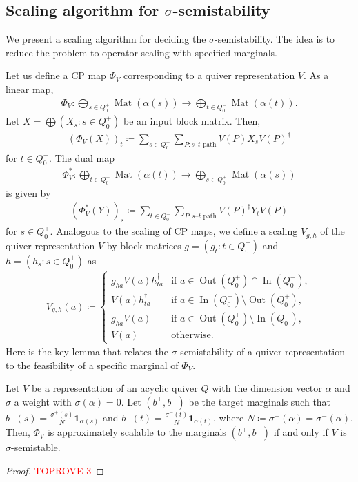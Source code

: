 \documentclass[a4paper,11pt]{article}
\numberwithin{equation}{section}
\newcommand{\ones}{\mathbf{1}}
\DeclareMathOperator{\Mat}{Mat}
\DeclareMathOperator{\In}{In}
\DeclareMathOperator{\Out}{Out}
\begin{document}
\subsection{Scaling algorithm for $\sigma$-semistability}
We present a scaling algorithm for deciding the $\sigma$-semistability.
The idea is to reduce the problem to operator scaling with specified marginals. 

Let us define a CP map $\Phi_V$ corresponding to a quiver representation $V$.
As a linear map,
\begin{align}
    \Phi_V : \bigoplus_{s \in Q_0^+} \Mat(\alpha(s)) \to \bigoplus_{t \in Q_0^-} \Mat(\alpha(t)).
\end{align}
Let $X = \bigoplus (X_s : s \in Q_0^+)$ be an input block matrix.
Then,
\begin{align}
    (\Phi_V(X))_t \coloneqq  \sum_{s \in Q_0^+}\sum_{P: \text{$s$--$t$ path}} V(P) X_{s} V(P)^\dagger
\end{align}
for $t \in Q_0^-$.
The dual map 
\begin{align}
    \Phi_V^*: \bigoplus_{t \in Q_0^-} \Mat(\alpha(t)) \to \bigoplus_{s \in Q_0^+} \Mat(\alpha(s))
\end{align}
is given by
\begin{align}
    (\Phi_V^*(Y))_s \coloneqq  \sum_{t \in Q_0^-}\sum_{P: \text{$s$--$t$ path}} V(P)^\dagger Y_{t} V(P)
\end{align}
for $s \in Q_0^+$.
Analogous to the scaling of CP maps, we define a scaling $V_{g,h}$ of the quiver representation $V$ by block matrices $g = (g_t : t \in Q_0^-)$ and $h = (h_s : s \in Q_0^+)$ as
\begin{align}
    V_{g,h}(a) \coloneqq 
    \begin{cases}
        g_{ha} V(a) h_{ta}^{\dagger}  & \text{if $a \in \Out(Q_0^+) \cap \In(Q_0^-)$}, \\
        V(a) h_{ta}^{\dagger} & \text{if $a \in \In(Q_0^-) \setminus \Out(Q_0^+)$}, \\
        g_{ha} V(a)  & \text{if $a \in \Out(Q_0^+) \setminus \In(Q_0^-)$}, \\
        V(a) & \text{otherwise}.
    \end{cases}
\end{align}
Here is the key lemma that relates the $\sigma$-semistability of a quiver representation to the feasibility of a specific marginal of $\Phi_V$.

\begin{lemma}
    Let $V$ be a representation of an acyclic quiver $Q$ with the dimension vector $\alpha$ and $\sigma$ a weight with $\sigma(\alpha) = 0$.
    Let $(b^+, b^-)$ be the target marginals such that $b^+(s) = \frac{\sigma^+(s)}{N}\ones_{\alpha(s)}$ and $b^-(t) = \frac{\sigma^-(t)}{N}\ones_{\alpha(t)}$, where $N \coloneqq \sigma^+(\alpha) = \sigma^-(\alpha)$.
    Then, $\Phi_V$ is approximately scalable to the marginals $(b^+, b^-)$ if and only if $V$ is $\sigma$-semistable.
\end{lemma}
\begin{proof}\textcolor{red}{TOPROVE 3}\end{proof}
\end{document}
